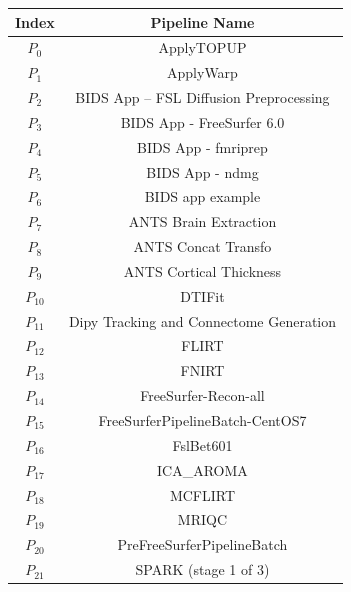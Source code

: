\documentclass[conference]{IEEEtran}
\begin{document}













\begin{table}
    \centering
    \begin{tabular}{cc}
        \hline
        Index & Pipeline Name  \\
        \hline 
        $P_{0}$ & ApplyTOPUP \\
        $P_{1}$ & ApplyWarp\\
        $P_{2}$ & BIDS App -- FSL Diffusion Preprocessing\\
        $P_{3}$ & BIDS App - FreeSurfer 6.0\\
        $P_{4}$ & BIDS App - fmriprep\\
        $P_{5}$ & BIDS App - ndmg\\
        $P_{6}$ & BIDS app example\\
        $P_{7}$ & ANTS Brain Extraction\\
        $P_{8}$ & ANTS Concat Transfo\\
        $P_{9}$ & ANTS Cortical Thickness\\
        $P_{10}$ & DTIFit\\
        $P_{11}$ & Dipy Tracking and Connectome Generation\\
        $P_{12}$ & FLIRT	\\
        $P_{13}$ & FNIRT	\\
        $P_{14}$ & FreeSurfer-Recon-all\\
        $P_{15}$ & FreeSurferPipelineBatch-CentOS7\\
        $P_{16}$ & FslBet601	\\
        $P_{17}$ & ICA\_AROMA	\\
        $P_{18}$ & MCFLIRT	\\
        $P_{19}$ &MRIQC	\\
        $P_{20}$ & PreFreeSurferPipelineBatch	\\
        $P_{21}$ & SPARK (stage 1 of 3)	\\

\end{tabular}
\end{table}
\end{document}
